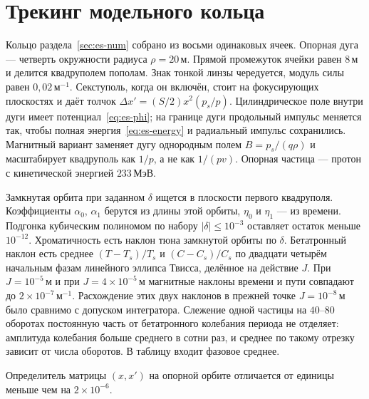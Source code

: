 \section{Трекинг модельного кольца}
\label{app:ch3track}

Кольцо раздела~\ref{sec:es-num} собрано из восьми одинаковых ячеек. Опорная дуга --- четверть окружности радиуса $\rho=20\,\mathrm{м}$. Прямой промежуток ячейки равен $8\,\mathrm{м}$ и делится квадруполем пополам. Знак тонкой линзы чередуется, модуль силы равен $0{,}02\,\mathrm{м}^{-1}$. Секступоль, когда он включён, стоит на фокусирующих плоскостях и даёт толчок $\Delta x'=(S/2)x^2(p_s/p)$. Цилиндрическое поле внутри дуги имеет потенциал~\eqref{eq:es-phi}; на границе дуги продольный импульс меняется так, чтобы полная энергия~\eqref{eq:es-energy} и радиальный импульс сохранились. Магнитный вариант заменяет дугу однородным полем $B=p_s/(q\rho)$ и масштабирует квадруполь как $1/p$, а не как $1/(pv)$. Опорная частица --- протон с кинетической энергией $233\,\mathrm{МэВ}$.

Замкнутая орбита при заданном $\delta$ ищется в плоскости первого квадруполя. Коэффициенты $\alpha_0$, $\alpha_1$ берутся из длины этой орбиты, $\eta_0$ и $\eta_1$ --- из времени. Подгонка кубическим полиномом по набору $|\delta|\le 10^{-3}$ оставляет остаток меньше $10^{-12}$. Хроматичность есть наклон тюна замкнутой орбиты по $\delta$. Бетатронный наклон есть среднее $(T-T_s)/T_s$ и $(C-C_s)/C_s$ по двадцати четырём начальным фазам линейного эллипса Твисса, делённое на действие $J$. При $J=10^{-5}\,\mathrm{м}$ и при $J=4\times 10^{-5}\,\mathrm{м}$ магнитные наклоны времени и пути совпадают до $2\times 10^{-7}\,\mathrm{м}^{-1}$. Расхождение этих двух наклонов в прежней точке $J=10^{-8}\,\mathrm{м}$ было сравнимо с допуском интегратора. Слежение одной частицы на $40$--$80$ оборотах постоянную часть от бетатронного колебания периода не отделяет: амплитуда колебания больше среднего в сотни раз, и среднее по такому отрезку зависит от числа оборотов. В таблицу входит фазовое среднее.

Определитель матрицы $(x,x')$ на опорной орбите отличается от единицы меньше чем на $2\times 10^{-6}$.

